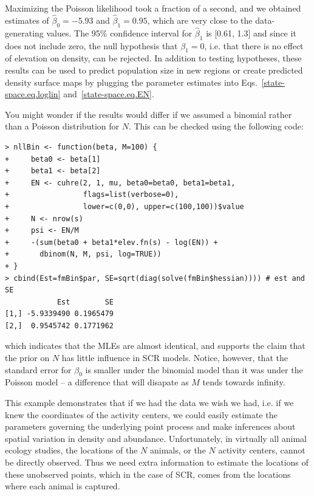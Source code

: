 Maximizing the Poisson likelihood took a fraction of a second, and we
obtained estimates of $\hat{\beta}_0=-5.93$ and $\hat{\beta}_1=0.95$,
which are very close to the data-generating values. The 95\% confidence
interval for $\hat{\beta}_1$ is [0.61, 1.3] and since it does not
include zero, the null hypothesis that $\beta_1=0$, i.e. that there is
no effect of elevation on density, can be rejected. In addition to testing
hypotheses, these results can be used to predict population size in
new regions or create predicted density surface maps by plugging the
parameter estimates into Eqs.~\ref{state-space.eq.loglin} and~\ref{state-space.eq.EN}.

You might wonder if the results would differ if we assumed a binomial
rather than a Poisson distribution for $N$. This can be checked
using the following code:
\begin{small}
\begin{verbatim}
> nllBin <- function(beta, M=100) {
+     beta0 <- beta[1]
+     beta1 <- beta[2]
+     EN <- cuhre(2, 1, mu, beta0=beta0, beta1=beta1,
+                 flags=list(verbose=0),
+                 lower=c(0,0), upper=c(100,100))$value
+     N <- nrow(s)
+     psi <- EN/M
+     -(sum(beta0 + beta1*elev.fn(s) - log(EN)) +
+       dbinom(N, M, psi, log=TRUE))
+ }
> cbind(Est=fmBin$par, SE=sqrt(diag(solve(fmBin$hessian)))) # est and SE
            Est        SE
[1,] -5.9339490 0.1965479
[2,]  0.9545742 0.1771962
\end{verbatim}
\end{small}
which indicates that the MLEs are almost identical, and
supports the claim that the prior
on $N$ has little influence in SCR models. Notice, however, that the
standard error for $\beta_0$ is smaller under the binomial model than
it was under the Poisson model -- a difference that will disapate as
$M$ tends towards infinity.

This example demonstrates
that if we had the data we wish we had, i.e. if we knew the
coordinates of the activity centers, we could easily estimate the
parameters governing the underlying point process and make inferences
about spatial variation in density and abundance. Unfortunately, in
virtually all animal ecology studies,
the locations of the $N$ animals, or the $N$ activity centers,
cannot be directly observed. Thus we need
extra information to estimate the locations of these unobserved
points, which in the case of SCR, comes from the locations where each
animal is captured.

